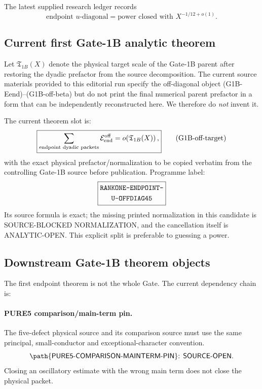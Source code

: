 \documentclass[11pt]{article}
\theoremstyle{definition}
\newcommand{\1}{\mathbf 1}
\newcommand{\status}[1]{\textsf{#1}}
\begin{document}
The latest supplied research ledger records
\[
\boxed{
\text{endpoint }u\text{-diagonal}
=
\text{power closed with }X^{-1/12+o(1)}.
}
\tag{G1B-diag-status}
\]

\subsection{Current first Gate-1B analytic theorem}

Let $\mathfrak T_{1B}(X)$ denote the physical target scale of the Gate-1B parent after
restoring the dyadic prefactor from the source decomposition.  The current source materials
provided to this editorial run specify the off-diagonal object (G1B-Eend)--(G1B-off-beta)
but do not print the final numerical parent prefactor in a form that can be independently
reconstructed here.  We therefore do \emph{not} invent it.

The current theorem slot is:
\[
\boxed{
\sum_{\text{endpoint dyadic packets}}
\mathcal E_{\rm end}^{\rm off}
=
o\!\left(\mathfrak T_{1B}(X)\right),
}
\tag{G1B-off-target}
\]
with the exact physical prefactor/normalization to be copied verbatim from the controlling
Gate-1B source before publication.  Programme label:
\[
\boxed{\begin{gathered}\text{\ttfamily RANKONE-ENDPOINT-}\\\text{\ttfamily U-OFFDIAG45}\end{gathered}}
\]
Its source formula is exact; the missing printed normalization in this candidate is
\status{SOURCE-BLOCKED NORMALIZATION}, and the cancellation itself is
\status{ANALYTIC-OPEN}.  This explicit split is preferable to guessing a power.

\subsection{Downstream Gate-1B theorem objects}

The first endpoint theorem is not the whole Gate.  The current dependency chain is:

\paragraph{PURE5 comparison/main-term pin.}
The five-defect physical source and its comparison source must use the same principal,
small-conductor and exceptional-character convention.
\[
\status{\path{PURE5-COMPARISON-MAINTERM-PIN}: SOURCE-OPEN.}
\]
Closing an oscillatory estimate with the wrong main term does not close the physical packet.
\end{document}
